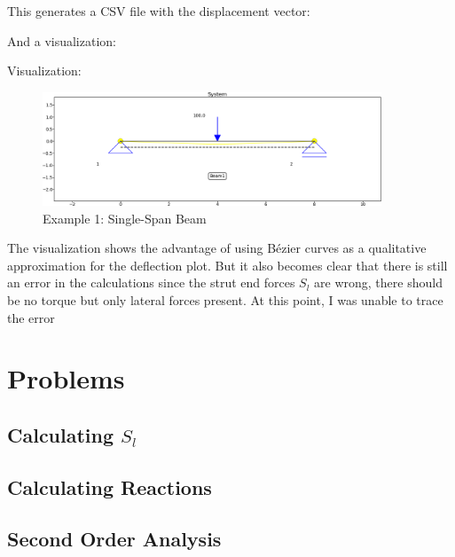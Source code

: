 This generates a CSV file with the displacement vector:


And a visualization:

Visualization:
\begin{figure}[h]%
    \centering
    \includegraphics[width=0.9\textwidth]{example1/Figure_1.png}%
    \caption{Example 1: Single-Span Beam}%
    \label{fig:example1}%
\end{figure}

The visualization shows the advantage of using B\'{e}zier curves as a qualitative approximation for the deflection plot.
But it also becomes clear that there is still an error in the calculations since the strut end forces $S_l$ are wrong, there should be no torque but only lateral forces present.
At this point, I was unable to trace the error 

\section{Problems}
\label{sec:problems}

\subsection{Calculating $S_l$}
\label{sec:calc_Sl}

\subsection{Calculating Reactions}
\label{sec:calc_reactions}

\subsection{Second Order Analysis}
\label{sec:secondOrderAna}
